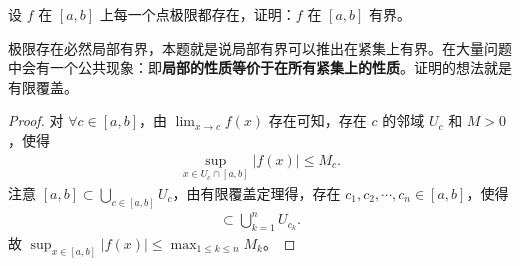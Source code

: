 \documentclass[../../main.tex]{subfiles}%
\begin{document}
\begin{example}
设 \(f\) 在 \([a,b]\) 上每一个点极限都存在，证明：\(f\) 在 \([a,b]\) 有界。
\end{example}
\begin{note}
极限存在必然局部有界，本题就是说局部有界可以推出在紧集上有界。在大量问题中会有一个公共现象：即\textbf{局部的性质等价于在所有紧集上的性质}。证明的想法就是有限覆盖。 
\end{note}
\begin{proof}

对 \(\forall c\in [a,b]\)，由 \(\lim_{x\rightarrow c}f(x)\) 存在可知，存在 \(c\) 的邻域 \(U_c\) 和 \(M>0\)，使得
\begin{align*}
\sup_{x\in U_c\cap [a,b]}|f(x)|\leqslant M_c.
\end{align*}
注意 \([a,b]\subset \bigcup_{c\in [a,b]}U_c\)，由有限覆盖定理得，存在 \(c_1,c_2,\cdots,c_n\in [a,b]\)，使得
\begin{align*}
[a,b]\subset \bigcup_{k = 1}^nU_{c_k}. 
\end{align*}
故 \(\sup_{x\in [a,b]}|f(x)|\leqslant \max_{1\leqslant k\leqslant n}M_k\)。 

\end{proof}
\end{document}
